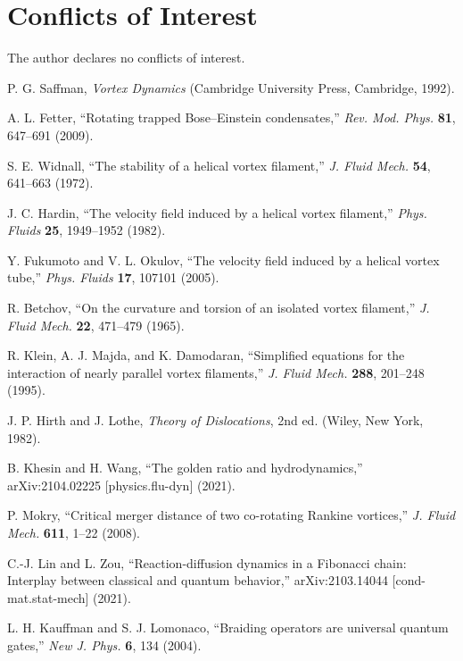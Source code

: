 \section*{Conflicts of Interest}
The author declares no conflicts of interest.

\begin{thebibliography}{99}

P. G. Saffman,
\emph{Vortex Dynamics}
(Cambridge University Press, Cambridge, 1992).

A. L. Fetter,
``Rotating trapped Bose–Einstein condensates,''
\emph{Rev. Mod. Phys.} \textbf{81}, 647--691 (2009).

S. E. Widnall,
``The stability of a helical vortex filament,''
\emph{J. Fluid Mech.} \textbf{54}, 641--663 (1972).

J. C. Hardin,
``The velocity field induced by a helical vortex filament,''
\emph{Phys. Fluids} \textbf{25}, 1949--1952 (1982).

Y. Fukumoto and V. L. Okulov,
``The velocity field induced by a helical vortex tube,''
\emph{Phys. Fluids} \textbf{17}, 107101 (2005).

R. Betchov,
``On the curvature and torsion of an isolated vortex filament,''
\emph{J. Fluid Mech.} \textbf{22}, 471--479 (1965).

R. Klein, A. J. Majda, and K. Damodaran,
``Simplified equations for the interaction of nearly parallel vortex filaments,''
\emph{J. Fluid Mech.} \textbf{288}, 201--248 (1995).

J. P. Hirth and J. Lothe,
\emph{Theory of Dislocations}, 2nd ed.
(Wiley, New York, 1982).

B. Khesin and H. Wang,
``The golden ratio and hydrodynamics,''
arXiv:2104.02225 [physics.flu-dyn] (2021).

P. Mokry,
``Critical merger distance of two co-rotating Rankine vortices,''
\emph{J. Fluid Mech.} \textbf{611}, 1--22 (2008).

C.-J. Lin and L. Zou,
``Reaction-diffusion dynamics in a Fibonacci chain: Interplay between classical and quantum behavior,''
arXiv:2103.14044 [cond-mat.stat-mech] (2021).

L. H. Kauffman and S. J. Lomonaco,
``Braiding operators are universal quantum gates,''
\emph{New J. Phys.} \textbf{6}, 134 (2004).


\end{thebibliography}
